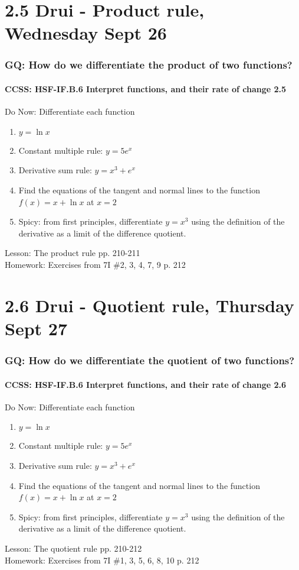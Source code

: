 \documentclass{beamer}
\begin{document}
\section{2.5 Drui - Product rule, Wednesday Sept 26}
  \frame
  {
    \frametitle{GQ: How do we differentiate the product of two functions?}
    \framesubtitle{CCSS: HSF-IF.B.6 Interpret functions, and their rate of change  \alert{2.5}}

    \begin{block}{Do Now: Differentiate each function}
      \begin{enumerate}
      \item $y= \ln x$
      \item Constant multiple rule: $y=5e^x$
      \item Derivative sum rule: $y=x^3+e^x$
      \item Find the equations of the tangent and normal lines to the function $f(x)=x+ \ln x$ at $x=2$
      \item Spicy: from first principles, differentiate $y=x^3$ using the definition of the derivative as a limit of the difference quotient.
      \end{enumerate}
   \end{block}
    Lesson: The product rule pp. 210-211\\ \bigskip
    Homework: Exercises from 7I \#2, 3, 4, 7, 9 p. 212
  }

  \section{2.6 Drui - Quotient rule, Thursday Sept 27}
    \frame
    {
      \frametitle{GQ: How do we differentiate the quotient of two functions?}
      \framesubtitle{CCSS: HSF-IF.B.6 Interpret functions, and their rate of change  \alert{2.6}}

      \begin{block}{Do Now: Differentiate each function}
        \begin{enumerate}
        \item $y= \ln x$
        \item Constant multiple rule: $y=5e^x$
        \item Derivative sum rule: $y=x^3+e^x$
        \item Find the equations of the tangent and normal lines to the function $f(x)=x+ \ln x$ at $x=2$
        \item Spicy: from first principles, differentiate $y=x^3$ using the definition of the derivative as a limit of the difference quotient.
        \end{enumerate}
     \end{block}
      Lesson: The quotient rule pp. 210-212\\ \bigskip
      Homework: Exercises from 7I \#1, 3, 5, 6, 8, 10 p. 212
    }
\end{document}

